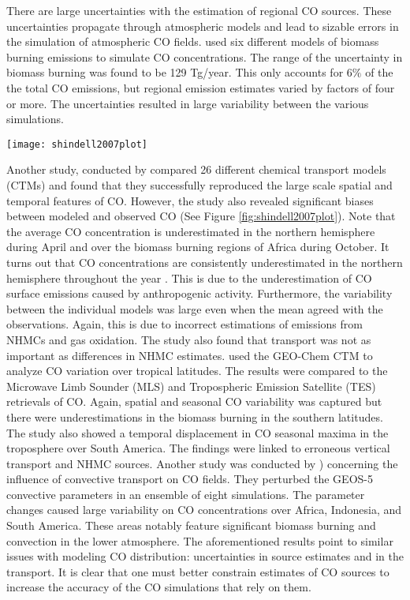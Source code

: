 There are large uncertainties with the estimation of regional CO sources. These uncertainties propagate through atmospheric models and lead to sizable errors in the simulation of atmospheric CO fields. \cite{bian2007} used six different models of biomass burning emissions to simulate CO concentrations. The range of the uncertainty in biomass burning was found to be 129 Tg/year. This only accounts for 6$\%$ of the the total CO emissions, but regional emission estimates varied by factors of four or more. The uncertainties resulted in large variability between the various simulations. 
\begin{figure*}
\texttt{[image: shindell2007plot]}
\caption{Differences between the chemical transport multi-model mean CO and MOPITT V3 CO for 2000-2004 (ppbv) at 500 hPa. The background CO field is 200 ppbv. Plot from \cite{shindell2006}.}
\label{fig:shindell2007plot}
\end{figure*}
%
Another study, conducted by \cite{shindell2006} compared 26 different chemical transport models (CTMs) and found that they successfully reproduced the large scale spatial and temporal features of CO. However, the study also revealed significant biases between modeled and observed CO (See Figure \ref{fig:shindell2007plot}). Note that the average CO concentration is underestimated in the northern hemisphere during April and over the biomass burning regions of Africa during October. It turns out that CO concentrations are consistently underestimated in the northern hemisphere throughout the year \cite{shindell2006}. This is due to the underestimation of CO surface emissions caused by anthropogenic activity. Furthermore, the variability between the individual models was large even when the mean agreed with the observations. Again, this is due to incorrect estimations of emissions from NHMCs and gas oxidation. The study also found that transport was not as important as differences in NHMC estimates. \cite{liu2010} used the GEO-Chem CTM to analyze CO variation over tropical latitudes. The results were compared to the Microwave Limb Sounder (MLS) and Tropospheric Emission Satellite (TES) retrievals of CO. Again, spatial and seasonal CO variability was captured but there were underestimations in the biomass burning in the southern latitudes. The study also showed a temporal displacement in CO seasonal maxima in the troposphere over South America. The findings were linked to erroneous vertical transport and NHMC sources. Another study was conducted by \cite{ott2011}) concerning the influence of convective transport on CO fields. They perturbed the GEOS-5 convective parameters in an ensemble of eight simulations. The parameter changes caused large variability on CO concentrations over Africa, Indonesia, and South America. These areas notably feature significant biomass burning and convection in the lower atmosphere. The aforementioned results point to similar issues with modeling CO distribution: uncertainties in source estimates and in the transport. It is clear that one must better constrain estimates of CO sources to increase the accuracy of the CO simulations that rely on them.
